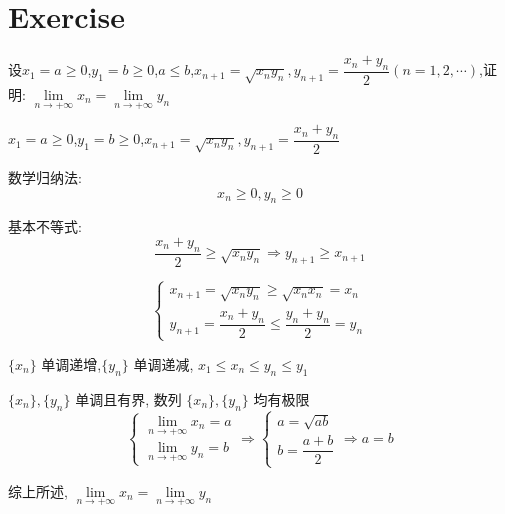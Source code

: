 \section{Exercise}
\begin{proposition}
	设$x_{1}=a\geq 0$,$y_{1}=b\geq 0$,$a\leq b$,$x_{n+1}=\sqrt{x_{n}y_{n}},y_{n+1}=\dfrac{x_{n}+y_{n}}{2}(n=1,2,\cdots)$,证明:
	$\lim\limits_{n\to +\infty}x_{n}=\lim\limits_{n\to +\infty}y_{n}$
\end{proposition}
\begin{solution}
	
	$x_{1}=a\geq 0$,$y_{1}=b\geq 0$,$x_{n+1}=\sqrt{x_{n}y_{n}},y_{n+1}=\dfrac{x_{n}+y_{n}}{2}$
	
	数学归纳法:  
	$$x_{n}\geq 0, y_{n}\geq 0$$
	
	基本不等式:  
	$$\dfrac{x_{n}+y_{n}}{2}\geq \sqrt{x_{n}y_{n}}\Rightarrow y_{n+1}\geq x_{n+1}$$
	
	$$
	\begin{cases}
		x_{n+1}=\sqrt{x_{n}y_{n}}\geq \sqrt{x_{n}x_{n}} = x_{n}\\
		y_{n+1}=\dfrac{x_{n}+y_{n}}{2}\leq \dfrac{y_{n}+y_{n}}{2} = y_{n}
	\end{cases}
	$$
	
	$\{x_{n}\}$ 单调递增,$\{y_{n}\}$ 单调递减, $x_{1}\leq x_{n}\leq y_{n}\leq y_{1}$
	
	$\{x_{n}\},\{y_{n}\}$ 单调且有界, 数列 $\{x_{n}\},\{y_{n}\}$ 均有极限 
	$$\begin{cases}
		\lim\limits_{n\to +\infty}x_{n} = a\\
		\lim\limits_{n\to +\infty}y_{n} = b
	\end{cases} \Rightarrow 
	\begin{cases}
		a = \sqrt{ab}\\
		b = \dfrac{a+b}{2}
	\end{cases}\Rightarrow a=b$$
	
	综上所述, $\lim\limits_{n\to +\infty}x_{n}=\lim\limits_{n\to +\infty}y_{n}$
\end{solution}

